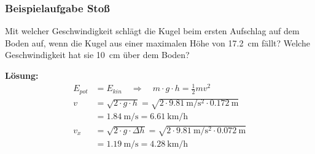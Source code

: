 \documentclass{article}
\begin{document}
\frame
{
{
  \frametitle{Beispielaufgabe Stoß}
Mit welcher Geschwindigkeit schlägt die Kugel beim ersten Aufschlag auf dem Boden auf, wenn die Kugel aus einer maximalen Höhe von \SI{17,2}{\centi\meter} fällt? Welche Geschwindigkeit hat sie \SI{10}{\centi\meter} über dem Boden?\\
}
{
\textbf{Lösung:}	
	\begin{align*}
	E_{pot}&=E_{kin}\quad\Rightarrow\quad m\cdot g\cdot h=\frac{1}{2}mv^2\\
	v&=\sqrt{2\cdot g\cdot h}=\sqrt{2\cdot \SI{9,81}{\meter\per\square\second}\cdot \SI{0,172}{\meter}}\\
	&=\SI{1,84}{\meter\per\second}=\SI{6,61}{\kilo\meter\per\hour}\\
	v_x&=\sqrt{2\cdot g\cdot\Delta h}=\sqrt{2\cdot \SI{9,81}{\meter\per\square\second}\cdot\SI{0,072}{\meter}}\\
	&=\SI{1,19}{\meter\per\second}=\SI{4,28}{\kilo\meter\per\hour}
	\end{align*}
}
}
\end{document}
